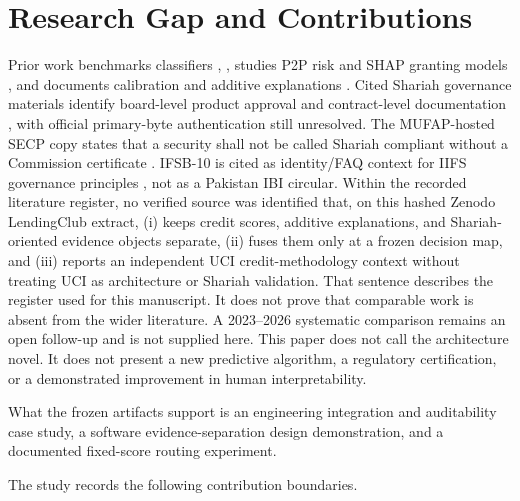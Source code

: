 \documentclass{ieeeaccess}
\begin{document}
\section{Research Gap and Contributions}

Prior work benchmarks classifiers \cite{b2}, \cite{b3}, studies P2P risk and SHAP granting models \cite{b5,b6,b7}, and documents calibration and additive explanations \cite{b9,b10,b11,b12,b13,b14,b15,b16}. Cited Shariah governance materials identify board-level product approval and contract-level documentation \cite{b24,b25,b26}, with official primary-byte authentication still unresolved. The MUFAP-hosted SECP copy states that a security shall not be called Shariah compliant without a Commission certificate \cite{b27}. IFSB-10 is cited as identity/FAQ context for IIFS governance principles \cite{b31}, not as a Pakistan IBI circular. Within the recorded literature register, no verified source was identified that, on this hashed Zenodo LendingClub extract, (i) keeps credit scores, additive explanations, and Shariah-oriented evidence objects separate, (ii) fuses them only at a frozen decision map, and (iii) reports an independent UCI credit-methodology context without treating UCI as architecture or Shariah validation. That sentence describes the register used for this manuscript. It does not prove that comparable work is absent from the wider literature. A 2023--2026 systematic comparison remains an open follow-up and is not supplied here. This paper does not call the architecture novel. It does not present a new predictive algorithm, a regulatory certification, or a demonstrated improvement in human interpretability.

What the frozen artifacts support is an engineering integration and auditability case study, a software evidence-separation design demonstration, and a documented fixed-score routing experiment.

The study records the following contribution boundaries.
\end{document}
